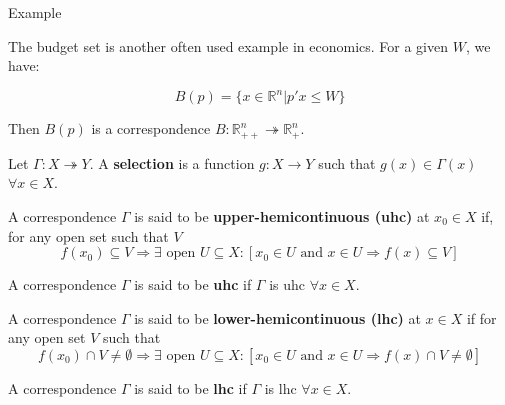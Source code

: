 \documentclass[aspectratio=169, handout]{beamer}
\begin{document}
\begin{frame}{Example}

    The budget set is another often used example in economics. For a given $W$, we have:

    \[B(p) = \{x\in\mathds{R}^n | p'x\leq W\}\]

    Then $B(p)$ is a correspondence $B: \mathds{R}^n_{++}\twoheadrightarrow\mathds{R}^n_+$.
    
\end{frame}

\begin{frame}
    \begin{definition}
        Let $\Gamma:X\twoheadrightarrow Y$. A \textbf{selection} is a function $g:X\rightarrow Y$ such that $g(x)\in \Gamma(x)$ $\forall x\in X$.
    \end{definition}
\end{frame}

\begin{frame}
    \begin{definition}
        A correspondence $\Gamma$ is said to be \textbf{upper-hemicontinuous (uhc)} at $x_0\in X$ if, for any open set such that $V$ \[f(x_0)\subseteq V \Rightarrow \exists \text{ open } U\subseteq X:[x_0\in U \text{ and } x\in U\Rightarrow f(x)\subseteq V] \]
    \end{definition}

    \pause

    \begin{definition}
        A correspondence $\Gamma$ is said to be \textbf{uhc} if $\Gamma$ is uhc $\forall x\in X$.
    \end{definition}
\end{frame}

\begin{frame}
    \begin{definition}
        A correspondence $\Gamma$ is said to be \textbf{lower-hemicontinuous (lhc)} at $x\in X$ if for any open set $V$ such that
        \[f(x_0)\cap V \neq\emptyset\Rightarrow \exists \text{ open } U\subseteq X: [x_0\in U\text{ and }x\in U\Rightarrow f(x)\cap V\neq \emptyset]\]
        
    \end{definition}

    \begin{definition}
        A correspondence $\Gamma$ is said to be \textbf{lhc} if $\Gamma$ is lhc $\forall x\in X$.
    \end{definition}
\end{frame}
\end{document}
